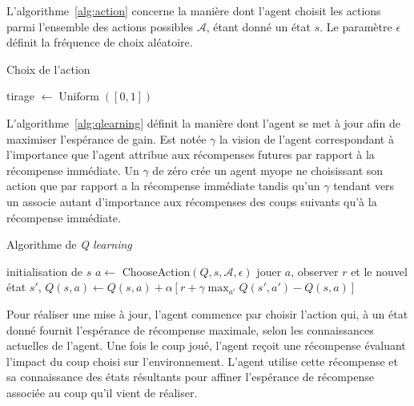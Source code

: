 \documentclass{report}
\DeclareMathOperator{\argmax}{argmax}
\DeclareMathOperator{\uniform}{Uniform}
\begin{document}
L'algorithme~\ref{alg:action} concerne la manière dont l'agent choisit les
actions parmi l'ensemble des actions possibles \(\mathcal{A}\), étant donné un
état \(s\). Le paramètre \(\epsilon\) définit la fréquence de choix aléatoire.
\begin{algorithm}
  \caption{Choix de l'action}\label{alg:action}
  \begin{algorithmic}
    [1]
    \State{} tirage \(\gets \uniform([0, 1])\)
    \Return{\(\argmax_{a\in\mathcal{A}} Q(s, a)\)}
    \Else{}
    \Return{\(\uniform(\mathcal{A})\)}
    \EndIf{}
    \EndProcedure{}
  \end{algorithmic}
\end{algorithm}


L'algorithme~\ref{alg:qlearning} définit la manière dont l'agent se met à jour
afin de maximiser l'espérance de gain. Est notée \(\gamma\) la vision de
l'agent correspondant à l'importance que l'agent attribue aux récompenses
futures par rapport à la récompense immédiate. Un \(\gamma\) de zéro crée un
agent myope ne choisissant son action que par rapport a la récompense immédiate
tandis qu'un \(\gamma\) tendant vers un associe autant d'importance aux
récompenses des coups suivants qu'à la récompense immédiate.
\begin{algorithm}
  \caption{Algorithme de \textit{Q learning}}\label{alg:qlearning}
  \begin{algorithmic}
    [1]
    \Repeat{}
    \State{} initialisation de \(s\)
    \Repeat{}
    \State{} \(a \gets\) ChooseAction$(Q, s, \mathcal{A}, \epsilon)$
    \State{} jouer \(a\), observer \(r\) et le nouvel \'etat \(s'\),
    \State{} \(Q(s, a) \gets Q(s, a) + \alpha\left[ r + \gamma \max_{a'}
      Q(s', a') - Q(s, a)\right]\)
    \EndProcedure{}
  \end{algorithmic}
\end{algorithm}

Pour réaliser une mise à jour, l'agent commence par choisir l'action qui, à un
état donné fournit l'espérance de récompense maximale, selon les connaissances
actuelles de l'agent. Une fois le coup joué, l'agent reçoit une récompense
évaluant l'impact du coup choisi sur l'environnement. L'agent utilise
cette récompense et sa connaissance des états résultants pour affiner
l'espérance de récompense associée au coup qu'il vient de réaliser.
\end{document}
